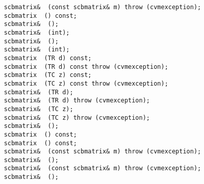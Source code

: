 \verb"    scbmatrix& "\verb" (const scbmatrix& m) throw (cvmexception);"\\
\verb"    scbmatrix "\verb" () const;"\\
\verb"    scbmatrix& "\verb" ();"\\
\verb"    scbmatrix& "\verb" (int);"\\
\verb"    scbmatrix& "\verb" ();"\\
\verb"    scbmatrix& "\verb" (int);"\\
\verb"    scbmatrix "\verb" (TR d) const;"\\
\verb"    scbmatrix "\verb" (TR d) const throw (cvmexception);"\\
\verb"    scbmatrix "\verb" (TC z) const;"\\
\verb"    scbmatrix "\verb" (TC z) const throw (cvmexception);"\\
\verb"    scbmatrix& "\verb" (TR d);"\\
\verb"    scbmatrix& "\verb" (TR d) throw (cvmexception);"\\
\verb"    scbmatrix& "\verb" (TC z);"\\
\verb"    scbmatrix& "\verb" (TC z) throw (cvmexception);"\\
\verb"    scbmatrix& "\verb" ();"\\
\verb"    scbmatrix "\verb" () const;"\\
\verb"    scbmatrix "\verb" () const;"\\
\verb"    scbmatrix& "\verb" (const scbmatrix& m) throw (cvmexception);"\\
\verb"    scbmatrix& "\verb" ();"\\
\verb"    scbmatrix& "\verb" (const scbmatrix& m) throw (cvmexception);"\\
\verb"    scbmatrix& "\verb" ();"\\
